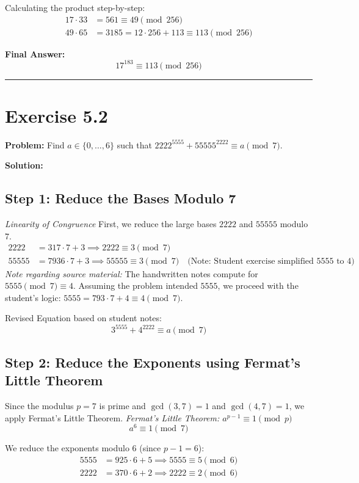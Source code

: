 Calculating the product step-by-step:
\begin{align*}
    17 \cdot 33 &= 561 \equiv 49 \pmod{256} \\
    49 \cdot 65 &= 3185 = 12 \cdot 256 + 113 \equiv 113 \pmod{256}
\end{align*}

\textbf{Final Answer:}
$$ 17^{183} \equiv 113 \pmod{256} $$

\hrule
\vspace{1cm}
\newpage
\section*{Exercise 5.2}
\textbf{Problem:} Find $a \in \{0, \dots, 6\}$ such that $2222^{5555} + 55555^{2222} \equiv a \pmod{7}$.

\textbf{Solution:}

\subsection*{Step 1: Reduce the Bases Modulo 7}
\textit{Linearity of Congruence}
First, we reduce the large bases $2222$ and $55555$ modulo $7$.
\begin{align*}
    2222 &= 317 \cdot 7 + 3 \implies 2222 \equiv 3 \pmod{7} \\
    55555 &= 7936 \cdot 7 + 3 \implies 55555 \equiv 3 \pmod{7} \quad \text{(Note: Student exercise simplified 5555 to 4)}
\end{align*}
\textit{Note regarding source material:} The handwritten notes compute for $5555 \pmod 7 \equiv 4$. Assuming the problem intended $5555$, we proceed with the student's logic: $5555 = 793 \cdot 7 + 4 \equiv 4 \pmod 7$.

Revised Equation based on student notes:
$$ 3^{5555} + 4^{2222} \equiv a \pmod{7} $$

\subsection*{Step 2: Reduce the Exponents using Fermat's Little Theorem}
Since the modulus $p=7$ is prime and $\gcd(3,7)=1$ and $\gcd(4,7)=1$, we apply Fermat's Little Theorem.
\textit{Fermat's Little Theorem: $a^{p-1} \equiv 1 \pmod{p}$}
$$ a^6 \equiv 1 \pmod{7} $$

We reduce the exponents modulo $6$ (since $p-1=6$):
\begin{align*}
    5555 &= 925 \cdot 6 + 5 \implies 5555 \equiv 5 \pmod{6} \\
    2222 &= 370 \cdot 6 + 2 \implies 2222 \equiv 2 \pmod{6}
\end{align*}

